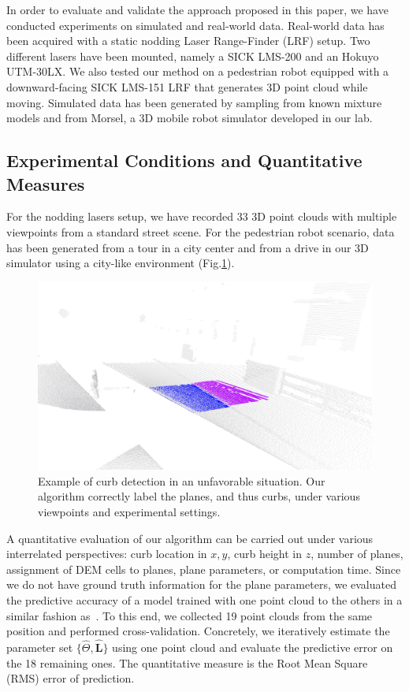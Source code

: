 In order to evaluate and validate the approach proposed in this paper, we have
conducted experiments on simulated and real-world data. Real-world data
has been acquired with a static nodding Laser Range-Finder (LRF) setup. Two
different lasers have been mounted, namely a SICK LMS-200 and an Hokuyo
UTM-30LX. We also tested our method on a pedestrian robot equipped with a
downward-facing SICK LMS-151 LRF that generates 3D point cloud while moving.
Simulated data has been generated by sampling from known mixture models and from
Morsel, a 3D mobile robot simulator developed in our lab.

\subsection{Experimental Conditions and Quantitative Measures}

For the nodding lasers setup, we have recorded 33 3D point clouds with multiple
viewpoints from a standard street scene. For the pedestrian robot scenario, data
has been generated from a tour in a city center and from a drive in our
3D simulator using a city-like environment (Fig.\ref{fig:morsel}).

\begin{figure}[t]
\centering
\includegraphics[width=\columnwidth]{fig/special.eps}
\caption{Example of curb detection in an unfavorable situation. Our algorithm
correctly label the planes, and thus curbs, under various viewpoints and
experimental settings.}
\label{fig:morsel}
\end{figure}

A quantitative evaluation of our algorithm can be carried out under various
interrelated perspectives: curb location in $x,y$, curb height in $z$,
number of planes, assignment of DEM cells to planes, plane parameters, or
computation time. Since we do not have ground truth information for the plane
parameters, we evaluated the predictive accuracy of a model trained
with one point cloud to the others in a similar fashion as~\cite{faria10fitting}.
To this end, we collected 19 point clouds from the same position and performed
cross-validation. Concretely, we iteratively estimate the parameter set
$\{\hat{\Theta},\mathbf{\hat{L}}\}$ using one point cloud and evaluate the
predictive error on the 18 remaining ones. The quantitative measure is the Root
Mean Square (RMS) error of prediction.

